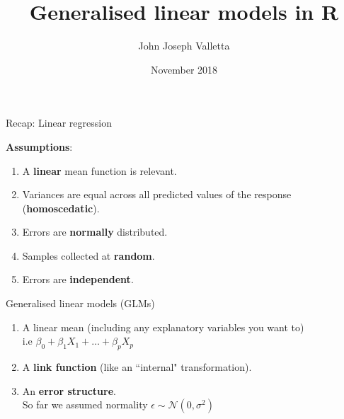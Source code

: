 \documentclass[pdf,handout]{beamer}
\title[GLMs in R]{Generalised linear models in R}
\author{John Joseph Valletta}
\date[November 2018]{November 2018}
\institute[]{University of Exeter, Penryn Campus, UK}
\begin{document}
\begin{frame}
\titlepage
\end{frame}

\begin{frame}{Recap: Linear regression}

\textbf{Assumptions}:

\begin{enumerate}\addtolength{\itemsep}{1\baselineskip}
    \item A \textbf{linear} mean function is relevant.
    \item Variances are equal across all predicted values of the response (\textbf{homoscedatic}).
    \item Errors are \textbf{normally} distributed. 
    \item Samples collected at \textbf{random}.
    \item Errors are \textbf{independent}.
\end{enumerate}

\end{frame}

\begin{frame}{Generalised linear models (GLMs)}

\begin{enumerate}\addtolength{\itemsep}{2\baselineskip}
    \item A linear mean (including any explanatory variables you want to)\\ i.e $\beta_0 + \beta_1X_1 + \ldots + \beta_pX_p$
    \item A \textbf{link function} (like an ``internal" transformation).
    \item An \textbf{error structure}.\\ So far we assumed normality $\epsilon \sim \mathcal{N}(0,\sigma^2)$
\end{enumerate}

\end{frame}
\end{document}
